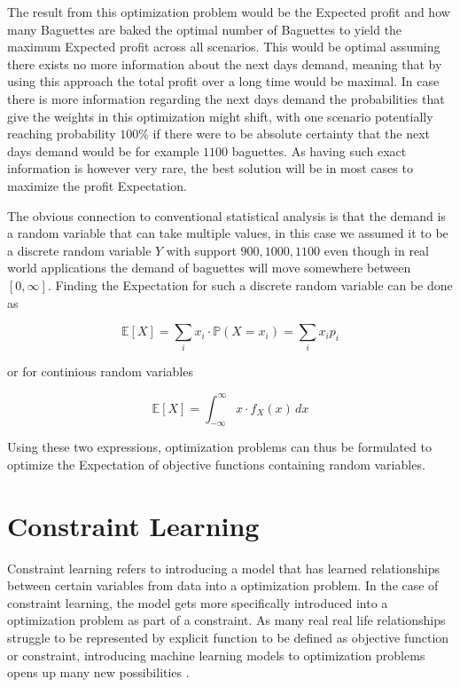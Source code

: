 The result from this optimization problem would be the Expected profit and how many Baguettes are baked the optimal number of Baguettes to yield the maximum Expected profit across all scenarios. This would be optimal assuming there exists no more information about the next days demand, meaning that by using this approach the total profit over a long time would be maximal. In case there is more information regarding the next days demand the probabilities that give the weights in this optimization might shift, with one scenario potentially reaching probability $100\%$ if there were to be absolute certainty that the next days demand would be for example $1100$ baguettes. As having such exact information is however very rare, the best solution will be in most cases to maximize the profit Expectation. 

The obvious connection to conventional statistical analysis is that the demand is a random variable that can take multiple values, in this case we assumed it to be a discrete random variable $Y$ with support ${900,1000,1100}$ even though in real world applications the demand of baguettes will move somewhere between $[0,\infty]$. Finding the Expectation for such a discrete random variable can be done as 

\[
\mathbb{E}[X] = \sum_{i} x_i \cdot \mathbb{P}(X = x_i) = \sum_{i} x_i p_i
\]

or for continious random variables  
 
\[
\mathbb{E}[X] = \int_{-\infty}^{\infty} x \cdot f_X(x) \, dx
\]

Using these two expressions, optimization problems can thus be formulated to optimize the Expectation of objective functions containing random variables. \cite{BirgeLouveauxStochasticProgramming}


\section{Constraint Learning} \label{sec:constraint_learning}

Constraint learning refers to introducing a model that has learned relationships between certain variables from data into a optimization problem. In the case of constraint learning, the model gets more specifically introduced into a optimization problem as part of a constraint. As many real real life relationships struggle to be represented by explicit function to be defined as objective function or constraint, introducing machine learning models to optimization problems opens up many new possibilities \cite{FAJEMISIN20241}.

